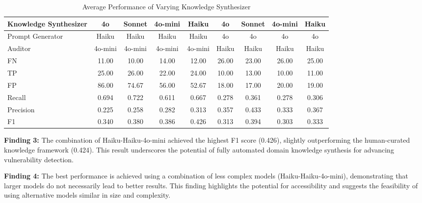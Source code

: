 \begin{table}
\caption{Average Performance of Varying Knowledge Synthesizer}
\label{table:aigenknowledge}
\begin{tabular}{@{}l|cccc|cccc@{}}
\toprule
Knowledge Synthesizer & 4o      & Sonnet  & 4o-mini & Haiku   & 4o    & Sonnet & 4o-mini & Haiku \\ 
\midrule
Prompt Generator      & Haiku   & Haiku   & Haiku   & Haiku   & 4o    & 4o     & 4o      & 4o    \\
Auditor               & 4o-mini & 4o-mini & 4o-mini & 4o-mini & Haiku & Haiku  & Haiku   & Haiku \\
\midrule
FN                    & 11.00   & 10.00   & 14.00   & 12.00   & 26.00 & 23.00  & 26.00   & 25.00 \\
TP                    & 25.00   & 26.00   & 22.00   & 24.00   & 10.00 & 13.00  & 10.00   & 11.00 \\
FP                    & 86.00   & 74.67   & 56.00   & 52.67   & 18.00 & 17.00  & 20.00   & 19.00 \\ 
\midrule
Recall                & 0.694   & 0.722   & 0.611   & 0.667   & 0.278 & 0.361  & 0.278   & 0.306 \\
Precision             & 0.225   & 0.258   & 0.282   & 0.313   & 0.357 & 0.433  & 0.333   & 0.367 \\
F1                    & 0.340   & 0.380   & 0.386   & {\color[HTML]{C834FC} 0.426}   & 0.313 & 0.394  & 0.303   & 0.333 \\ \bottomrule
\end{tabular}
\end{table}

\begin{tcolorbox}[colback=gray!20!white, colframe=gray!75!black, boxsep=5pt, arc=4pt, boxrule=1pt, left=0pt, right=0pt] 
\textbf{Finding 3:}
The combination of Haiku-Haiku-4o-mini achieved the highest F1 score (0.426), slightly outperforming the human-curated knowledge framework (0.424). This result underscores the potential of fully automated domain knowledge synthesis for advancing vulnerability detection.
\end{tcolorbox}

\begin{tcolorbox}[colback=gray!20!white, colframe=gray!75!black, boxsep=5pt, arc=4pt, boxrule=1pt, left=0pt, right=0pt] 
\textbf{Finding 4:}
The best performance is achieved using a combination of less complex models (Haiku-Haiku-4o-mini), demonstrating that larger models do not necessarily lead to better results. 
This finding highlights the potential for accessibility and suggests the feasibility of using alternative models similar in size and complexity.
\end{tcolorbox}

